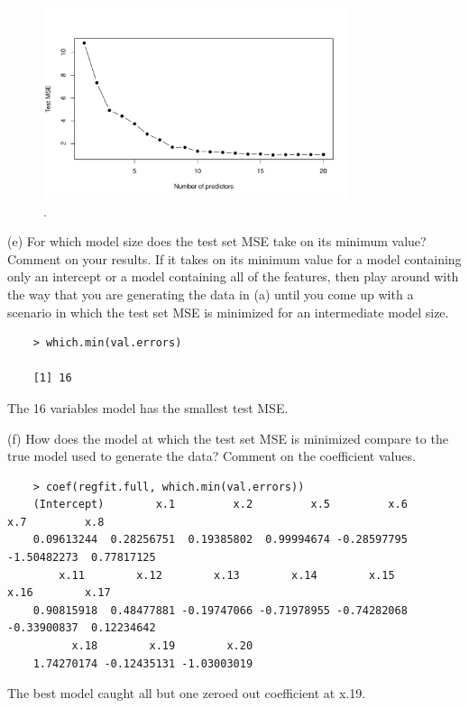 \documentclass{article}
\begin{document}
\begin{figure}[htb]
	\begin{center}
		\includegraphics[width=0.8\textwidth]{MTH522_hw5_p3d.pdf}
	\end{center}
	\caption{.}
	\label{fig:MTH522_hw5_p3d}
\end{figure}




(e) For which model size does the test set MSE take on its minimum value? Comment on your results. If it takes on its minimum value for a model containing only an intercept or a model containing all of the features, then play around with the way that you are generating the data in (a) until you come up with a scenario in which the test set MSE is minimized for an intermediate model size.

\begin{program}
	\begin{verbatim}
	> which.min(val.errors)
	
	[1] 16
	\end{verbatim}
\end{program}
The 16 variables model has the smallest test MSE.

\newpage


(f) How does the model at which the test set MSE is minimized compare to the true model used to generate the data? Comment on the coefficient values.

\begin{program}
	\begin{verbatim}
	> coef(regfit.full, which.min(val.errors))
	(Intercept)        x.1         x.2         x.5         x.6         x.7         x.8 
	0.09613244  0.28256751  0.19385802  0.99994674 -0.28597795 -1.50482273  0.77817125 
 	    x.11        x.12        x.13        x.14        x.15        x.16        x.17 
	0.90815918  0.48477881 -0.19747066 -0.71978955 -0.74282068 -0.33900837  0.12234642 
	      x.18        x.19        x.20 
	1.74270174 -0.12435131 -1.03003019 	
	\end{verbatim}
\end{program}
The best model caught all but one zeroed out coefficient at x.19.
\end{document}

